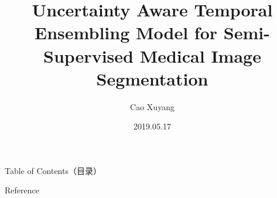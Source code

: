 \documentclass[t,15pt]{beamer}
\title{Uncertainty Aware Temporal Ensembling Model for Semi-Supervised Medical Image Segmentation}
\author{Cao Xuyang}
\date{2019.05.17}
\begin{document}
\frame{\titlepage}                  %

\begin{frame}{Table of Contents（目录）}    %
    \setcounter{tocdepth}{1}        %
    \tableofcontents                %
\end{frame}



\begin{frame}{Reference}
    
    \small
  
\end{frame}
\end{document}
